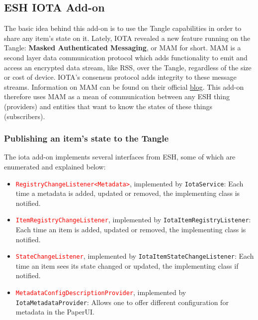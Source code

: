 \documentclass[a4paper,10pt]{article}
\begin{document}
\subsection{ESH IOTA Add-on}

The basic idea behind this add-on is to use the Tangle capabilities in order to share any item's state on it. Lately, IOTA revealed a new feature running on the Tangle: \textbf{Masked Authenticated Messaging}, or MAM for short. MAM is a second layer data communication protocol which adds functionality to emit and access an encrypted data stream, like RSS, over the Tangle, regardless of the size or cost of device. IOTA’s consensus protocol adds integrity to these message streams. Information on MAM can be found on their official \textcolor{blue}{\underline{\href{https://blog.iota.org/introducing-masked-authenticated-messaging-e55c1822d50e}{blog}}}. This add-on therefore uses MAM as a mean of communication between any ESH thing (providers) and entities that want to know the states of these things (subscribers). 

\subsubsection{Publishing an item's state to the Tangle}


The iota add-on implements several interfaces from ESH, some of which are enumerated and explained below:

\begin{itemize}
	\item \texttt{\textcolor{red}{RegistryChangeListener<Metadata>}}, implemented by \texttt{\textcolor{OliveGreen}{IotaService}}: Each time a metadata is added, updated or removed, the implementing class is notified.
	\item \texttt{\textcolor{red}{ItemRegistryChangeListener}}, implemented by \texttt{\textcolor{OliveGreen}{IotaItemRegistryListener}}: Each time an item is added, updated or removed, the implementing class is notified.
	\item \texttt{\textcolor{red}{StateChangeListener}}, implemented by \texttt{\textcolor{OliveGreen}{IotaItemStateChangeListener}}: Each time an item sees its state changed or updated, the implementing class if notified. 
	\item \texttt{\textcolor{red}{MetadataConfigDescriptionProvider}}, implemented by \texttt{\textcolor{OliveGreen}{IotaMetadataProvider}}: Allows one to offer different configuration for metadata in the PaperUI.
\end{itemize}
\end{document}
